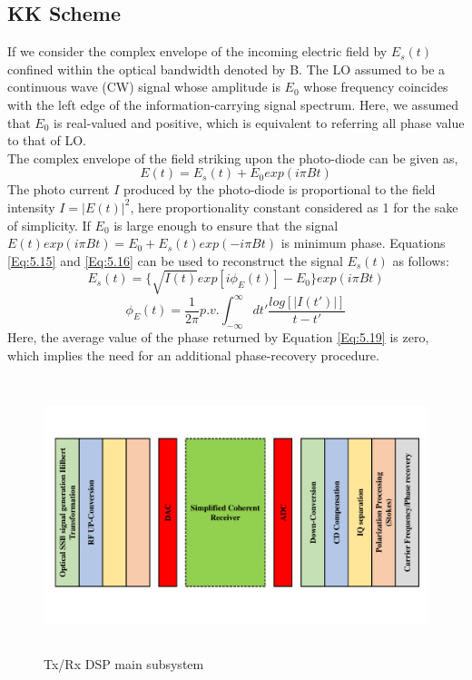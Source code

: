\subsection{KK Scheme}
If we consider the complex envelope of the incoming electric field by $E_s(t)$ confined within the optical bandwidth denoted by B. The LO assumed to be a continuous wave (CW) signal whose amplitude is $E_0$ whose frequency coincides with the left edge of the information-carrying signal spectrum. Here, we assumed that $E_0$ is real-valued and positive, which is equivalent to referring all phase value to that of LO.\\
The complex envelope of the field striking upon the photo-diode can be given as,
\begin{equation}
E(t)=E_s(t)+E_0 exp(i\pi Bt)
\end{equation}
The photo current $I$ produced by the photo-diode is proportional to the field intensity $I=|E(t)|^2$, here proportionality constant considered as 1 for the sake of simplicity. If $E_0$ is large enough to ensure that the signal $E(t)exp(i\pi Bt)=E_0+E_s(t)exp(-i\pi Bt)$ is minimum phase. Equations \ref{Eq:5.15} and \ref{Eq:5.16} can be used to reconstruct the signal $E_s(t)$ as follows:
\begin{equation}
E_s(t)=\{\sqrt{I(t)} exp[i\phi_E(t)]-E_0\} exp(i\pi Bt)
\end{equation}
\begin{equation}
\phi_E(t)=\dfrac{1}{2\pi} p.v. \int_{-\infty}^{\infty} dt' \frac{log[|I(t')|]}{t-t'}
\label{Eq:5.19}
\end{equation}
Here, the average value of the phase returned by Equation \ref{Eq:5.19} is zero, which implies the need for an additional phase-recovery procedure. 
\begin{figure}[h]
	\centering
	\includegraphics[width=1.0\textwidth, height=8cm]{./sdf/simplified_coherent_receiver/figures/detailed_subsystem.pdf}
	\caption{Tx/Rx DSP main subsystem}\label{DSP_main_subsystem}
\end{figure}

